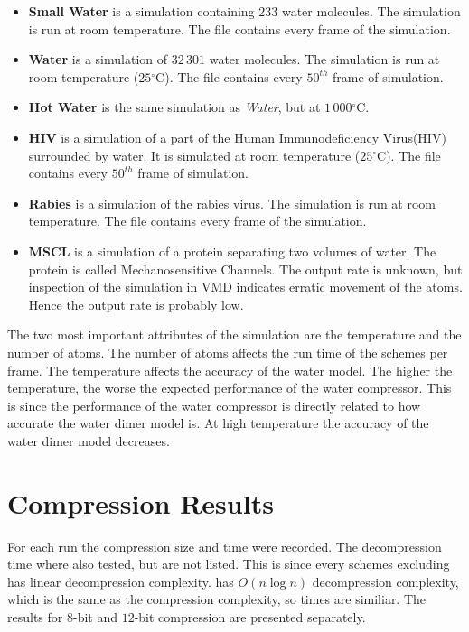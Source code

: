 \documentclass[a4paper]{report}
\newcommand{\degree}{\ensuremath{^\circ}}
\begin{document}
\begin{itemize}
\item{\textbf{Small Water}} is a simulation containing $233$ water
  molecules. The simulation is run at room temperature. The file contains
  every frame of the simulation.
\item{\textbf{Water}} is a simulation of $32\,301$ water molecules. The
  simulation is run at room temperature ($25\degree$C). The file contains
  every $50^{th}$ frame of simulation.
\item{\textbf{Hot Water}} is the same simulation as \emph{Water}, but at
  $1\,000\degree$C.
\item{\textbf{HIV}} is a simulation of a part of the Human Immunodeficiency
  Virus(HIV) surrounded by water. It is simulated at room temperature
  ($25\degree$C). The file contains every $50^{th}$ frame of simulation.
\item{\textbf{Rabies}} is a simulation of the rabies virus. The simulation is
  run at room temperature. The file contains every frame of the simulation.
\item{\textbf{MSCL}} is a simulation of a protein separating two volumes of
  water. The protein is called Mechanosensitive Channels. The output rate is
  unknown, but inspection of the simulation in VMD indicates erratic movement
  of the atoms. Hence the output rate is probably low.
\end{itemize}

The two most important attributes of the simulation are the temperature and
the number of atoms. The number of atoms affects the run time of the schemes
per frame. The temperature affects the accuracy of the water model. The higher
the temperature, the worse the expected performance of the water
compressor. This is since the performance of the water compressor is directly
related to how accurate the water dimer model is. At high temperature the
accuracy of the water dimer model decreases.

\section{Compression Results}

For each run the compression size and time were recorded. The decompression
time where also tested, but are not listed. This is since every schemes
excluding \citet{devillers2000gci} has linear decompression
complexity. \citet{devillers2000gci} has $O(n \log n)$ decompression
complexity, which is the same as the compression complexity, so times are
similiar. The results for $8$-bit and $12$-bit compression are presented
separately.
\end{document}

